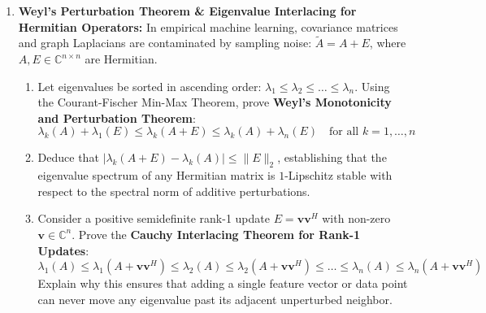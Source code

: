 \begin{enumerate}[label=\textbf{P\arabic*.}]
    \item \textbf{Weyl's Perturbation Theorem \& Eigenvalue Interlacing for Hermitian Operators:}
    In empirical machine learning, covariance matrices and graph Laplacians are contaminated by sampling noise: $\tilde{A} = A + E$, where $A, E \in \mathbb{C}^{n \times n}$ are Hermitian.
    \begin{enumerate}[label=(\alph*)]
        \item Let eigenvalues be sorted in ascending order: $\lambda_1 \le \lambda_2 \le \dots \le \lambda_n$. Using the Courant-Fischer Min-Max Theorem, prove \textbf{Weyl's Monotonicity and Perturbation Theorem}:
        \begin{equation*}
        \lambda_k(A) + \lambda_1(E) \le \lambda_k(A + E) \le \lambda_k(A) + \lambda_n(E) \quad \text{for all } k = 1, \dots, n
        \end{equation*}
        \item Deduce that $|\lambda_k(A + E) - \lambda_k(A)| \le \|E\|_2$, establishing that the eigenvalue spectrum of any Hermitian matrix is $1$-Lipschitz stable with respect to the spectral norm of additive perturbations.
        \item Consider a positive semidefinite rank-1 update $E = \mathbf{v}\mathbf{v}^H$ with non-zero $\mathbf{v} \in \mathbb{C}^n$. Prove the \textbf{Cauchy Interlacing Theorem for Rank-1 Updates}:
        \begin{equation*}
        \lambda_1(A) \le \lambda_1(A + \mathbf{v}\mathbf{v}^H) \le \lambda_2(A) \le \lambda_2(A + \mathbf{v}\mathbf{v}^H) \le \dots \le \lambda_n(A) \le \lambda_n(A + \mathbf{v}\mathbf{v}^H)
        \end{equation*}
        Explain why this ensures that adding a single feature vector or data point can never move any eigenvalue past its adjacent unperturbed neighbor.
    \end{enumerate}


\end{enumerate}
